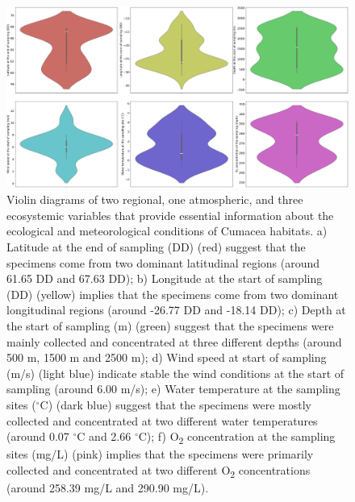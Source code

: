 \begin{figure}[htbp]
    \centering
    \includegraphics[width=\textwidth]{figure1.jpg}
    \caption{Violin diagrams of two regional, one atmospheric, and three ecosystemic variables that provide essential information about the ecological and meteorological conditions of Cumacea habitats. a) Latitude at the end of sampling (DD) (red) suggest that the specimens come from two dominant latitudinal regions (around 61.65 DD and 67.63 DD); b) Longitude at the start of sampling (DD) (yellow) implies that the specimens come from two dominant longitudinal regions (around -26.77 DD and -18.14 DD); c) Depth at the start of sampling (m) (green) suggest that the specimens were mainly collected and concentrated at three different depths (around 500 m, 1500 m and 2500 m); d) Wind speed at start of sampling (m/s) (light blue) indicate stable the wind conditions at the start of sampling (around 6.00 m/s); e) Water temperature at the sampling sites ($^\circ$C) (dark blue) suggest that the specimens were mostly collected and concentrated at two different water temperatures (around 0.07 $^\circ$C and 2.66 $^\circ$C); f) O\textsubscript{2} concentration at the sampling sites (mg/L) (pink) implies that the specimens were primarily collected and concentrated at two different O\textsubscript{2} concentrations (around 258.39 mg/L and 290.90 mg/L). \label{fig:fig3}}
\end{figure}

